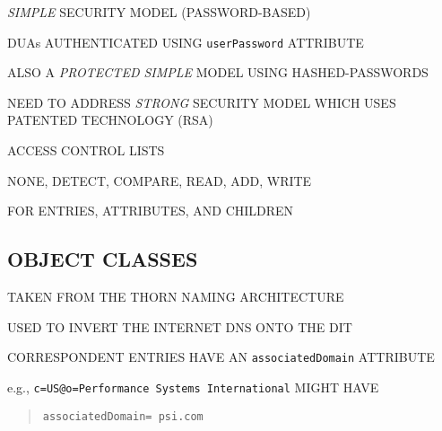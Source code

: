 \begin{bwslide}

\begin{nrtc}
\item	\emph{SIMPLE} SECURITY MODEL (PASSWORD-BASED)
    \begin{nrtc}
    \item	DUAs AUTHENTICATED USING \verb"userPassword" ATTRIBUTE
    \end{nrtc}

\item	ALSO A \emph{PROTECTED SIMPLE} MODEL USING HASHED-PASSWORDS

\item	NEED TO ADDRESS \emph{STRONG} SECURITY MODEL WHICH USES
	PATENTED TECHNOLOGY (RSA)

\item	ACCESS CONTROL LISTS
    \begin{nrtc}
    \item	NONE, DETECT, COMPARE, READ, ADD, WRITE
    \end{nrtc}
    FOR ENTRIES, ATTRIBUTES, AND CHILDREN
\end{nrtc}
\end{bwslide}


\begin{bwslide}
\part*	{OBJECT CLASSES}\bf

\begin{nrtc}
\item	TAKEN FROM THE THORN NAMING ARCHITECTURE
\end{nrtc}
\end{bwslide}


\begin{bwslide}

\begin{nrtc}
\item	USED TO INVERT THE INTERNET DNS ONTO THE DIT

\item	CORRESPONDENT ENTRIES HAVE AN \verb"associatedDomain" ATTRIBUTE

\item	e.g., \verb"c=US@o=Performance Systems International" MIGHT HAVE
\begin{quote}\small\begin{verbatim}
associatedDomain= psi.com
\end{verbatim}\end{quote}
\end{nrtc}
\end{bwslide}


